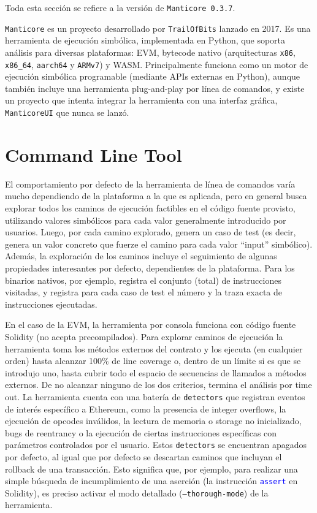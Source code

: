 Toda esta sección se refiere a la versión de \texttt{Manticore 0.3.7}.

\texttt{Manticore} es un proyecto desarrollado por \texttt{TrailOfBits} lanzado en 2017.
Es una herramienta de ejecución simbólica, implementada en Python, que soporta análisis para diversas plataformas: EVM, bytecode nativo (arquitecturas \texttt{x86}, \texttt{x86\_64}, \texttt{aarch64} y \texttt{ARMv7}) y WASM.
Principalmente funciona como un motor de ejecución simbólica programable (mediante APIs externas en Python), aunque también incluye una herramienta plug-and-play por línea de comandos, y existe un proyecto que intenta integrar la herramienta con una interfaz gráfica, \texttt{ManticoreUI} \cite{manticoreUI} que nunca se lanzó.

\section{Command Line Tool}

El comportamiento por defecto de la herramienta de línea de comandos varía mucho dependiendo de la plataforma a la que es aplicada, pero en general busca explorar todos los caminos de ejecución factibles en el código fuente provisto, utilizando valores simbólicos para cada valor generalmente introducido por usuarios.
Luego, por cada camino explorado, genera un caso de test (es decir, genera un valor concreto que fuerze el camino para cada valor ``input'' simbólico).
Además, la exploración de los caminos incluye el seguimiento de algunas propiedades interesantes por defecto, dependientes de la plataforma.
Para los binarios nativos, por ejemplo, registra el conjunto (total) de instrucciones visitadas, y registra para cada caso de test el número y la traza exacta de instrucciones ejecutadas.

En el caso de la EVM, la herramienta por consola funciona con código fuente Solidity (no acepta precompilados).
Para explorar caminos de ejecución la herramienta toma los métodos externos del contrato y los ejecuta (en cualquier orden) hasta alcanzar 100\% de line coverage o, dentro de un límite si es que se introdujo uno, hasta cubrir todo el espacio de secuencias de llamados a métodos externos.
De no alcanzar ninguno de los dos criterios, termina el análisis por time out.
La herramienta cuenta con una batería de \texttt{detectors} que registran eventos de  interés específico a Ethereum, como la presencia de integer overflows, la ejecución de opcodes inválidos, la lectura de memoria o storage no inicializado, bugs de reentrancy o la ejecución de ciertas instrucciones específicas con parámetros controlados por el usuario.
Estos \texttt{detectors} se encuentran apagados por defecto, al igual que por defecto se descartan caminos que incluyan el rollback de una transacción.
Esto significa que, por ejemplo, para realizar una simple búsqueda de incumplimiento de una aserción (la instrucción \textcolor{blue}{\texttt{assert}} en Solidity), es preciso activar el modo detallado (\texttt{--thorough-mode}) de la herramienta.

